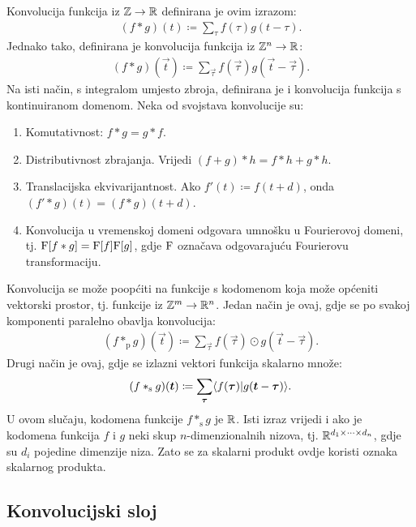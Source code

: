 \documentclass[utf8, diplomski, lmodern]{fer}
\begin{document}
Konvolucija funkcija iz $\mathbb{Z}\to\mathbb{R}$ definirana je ovim izrazom:
\begin{align}
(f*g)(t) \coloneqq \sum_\tau f(\tau)g(t-\tau) \text{.}
\end{align}
Jednako tako, definirana je konvolucija funkcija iz $\mathbb{Z}^n\to\mathbb{R}$:
\begin{align}
(f*g)(\vec t) \coloneqq \sum_{\vec\tau} f(\vec\tau)g(\vec t-\vec\tau) \text{.}
\end{align}
Na isti način, s integralom umjesto zbroja, definirana je i konvolucija funkcija s kontinuiranom domenom. Neka od svojstava konvolucije su:
\begin{enumerate}
	\item Komutativnost: $f*g=g*f$.
	\item Distributivnost zbrajanja. Vrijedi $(f+g)*h=f*h+g*h$.	
	\item Translacijska ekvivarijantnost. Ako $f'(t) \coloneqq f(t+d)$, onda $(f'*g)(t)=(f*g)(t+d)$.
	\item Konvolucija u vremenskoj domeni odgovara umnošku u Fourierovoj domeni, tj. $\mathrm{F}[f*g]=\mathrm{F}[f]\mathrm{F}[g]$, gdje $\mathrm{F}$ označava odgovarajuću Fourierovu transformaciju.
\end{enumerate}

Konvolucija se može poopćiti na funkcije s kodomenom koja može općeniti vektorski prostor, tj. funkcije iz $\mathbb{Z}^m\to\mathbb{R}^n$. Jedan način je ovaj, gdje se po svakoj komponenti paralelno obavlja konvolucija:
\begin{align}
(f*_\text{p}g)(\vec t) \coloneqq 
\sum_{\vec\tau} f(\vec\tau)\odot g(\vec t-\vec\tau) \text{.}
\end{align}
Drugi način je ovaj, gdje se izlazni vektori funkcija skalarno množe:
\begin{align} \label{eq:konvolucija-s}
(f*_\text{s}g)(\vec t) \coloneqq 
\sum_{\vec\tau} \braket{f(\vec\tau)}{g(\vec t-\vec\tau)} \text{.}
\end{align}
U ovom slučaju, kodomena funkcije $f*_\text{s}g$ je $\mathbb{R}$. Isti izraz vrijedi i ako je kodomena funkcija $f$ i $g$ neki skup $n$-dimenzionalnih nizova, tj. $\mathbb{R}^{d_1\times\dots\times d_n}$, gdje su $d_i$ pojedine dimenzije niza. Zato se za skalarni produkt ovdje koristi oznaka skalarnog produkta.

\subsection{Konvolucijski sloj}
\end{document}
